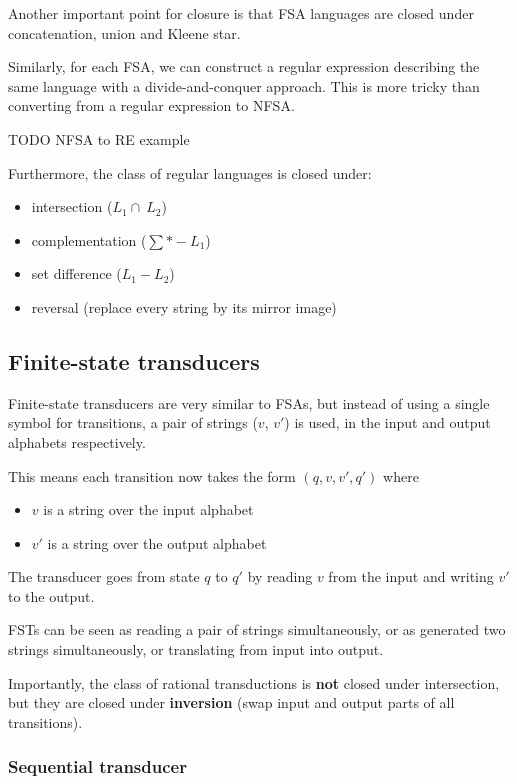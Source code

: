 \documentclass[Report.tex]{subfiles}
\begin{document}
Another important point for closure is that FSA languages are
closed under concatenation, union and Kleene star.

Similarly, for each FSA, we can construct a regular expression describing
the same language with a divide-and-conquer approach. This is more
tricky than converting from a regular expression to NFSA.

TODO NFSA to RE example

Furthermore, the class of regular languages is closed under:
\begin{itemize}
\item intersection ($L_1 \cap\ L_2$)
\item complementation ($\sum *  - L_1$)
\item set difference ($L_1 - L_2$)
\item reversal (replace every string by its mirror image)
\end{itemize}

\subsection{Finite-state transducers}
Finite-state transducers are very similar to FSAs, but instead of using a single
symbol for transitions, a pair of strings ($v$, $v'$) is used, in the input
and output alphabets respectively.

This means each transition now takes the form $(q, v, v', q')$ where
\begin{itemize}
\item $v$ is a string over the input alphabet
\item $v'$ is a string over the output alphabet
\end{itemize}
The transducer goes from state $q$ to $q'$ by reading $v$ from the input
and writing $v'$ to the output.

FSTs can be seen as reading a pair of strings simultaneously, or as 
generated two strings simultaneously, or translating from input into output. 

Importantly, the class of rational transductions is \textbf{not} closed under
intersection, but they are closed under \textbf{inversion} (swap input
and output parts of all transitions).

\subsubsection{Sequential transducer}
\end{document}

